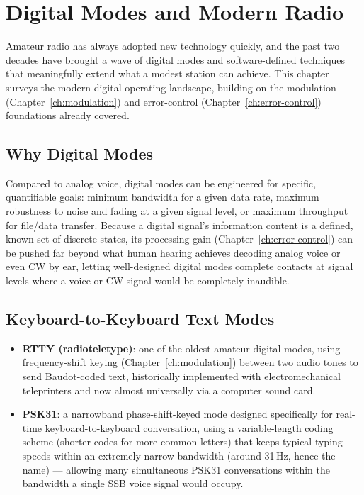 \chapter{Digital Modes and Modern Radio}
\label{ch:digital-modes}

Amateur radio has always adopted new technology quickly, and the past
two decades have brought a wave of digital modes and software-defined
techniques that meaningfully extend what a modest station can achieve.
This chapter surveys the modern digital operating landscape, building on
the modulation (Chapter~\ref{ch:modulation}) and error-control
(Chapter~\ref{ch:error-control}) foundations already covered.

\section{Why Digital Modes}

Compared to analog voice, digital modes can be engineered for
specific, quantifiable goals: minimum bandwidth for a given data rate,
maximum robustness to noise and fading at a given signal level, or
maximum throughput for file/data transfer. Because a digital signal's
information content is a defined, known set of discrete states, its
processing gain (Chapter~\ref{ch:error-control}) can be pushed far
beyond what human hearing achieves decoding analog voice or even CW by
ear, letting well-designed digital modes complete contacts at signal
levels where a voice or CW signal would be completely inaudible.

\section{Keyboard-to-Keyboard Text Modes}

\begin{itemize}
\item \textbf{RTTY (radioteletype)}: one of the oldest amateur digital
modes, using frequency-shift keying (Chapter~\ref{ch:modulation})
between two audio tones to send Baudot-coded text, historically
implemented with electromechanical teleprinters and now almost
universally via a computer sound card.
\item \textbf{PSK31}: a narrowband phase-shift-keyed mode designed
specifically for real-time keyboard-to-keyboard conversation, using a
variable-length coding scheme (shorter codes for more common letters)
that keeps typical typing speeds within an extremely narrow bandwidth
(around 31\,Hz, hence the name) --- allowing many simultaneous
PSK31 conversations within the bandwidth a single SSB voice signal
would occupy.
\end{itemize}

